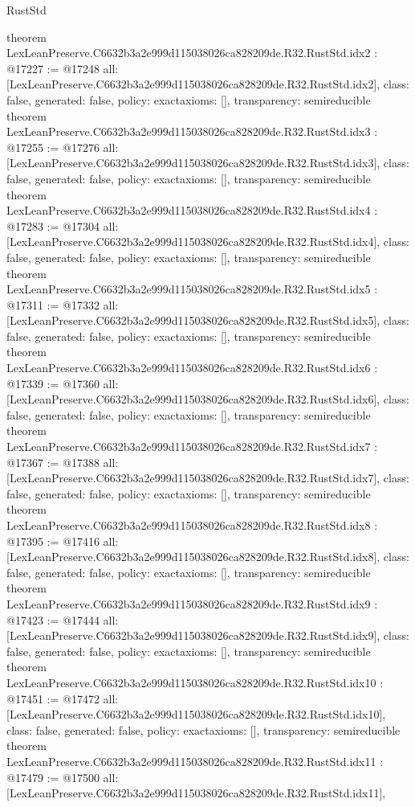 \begin{lexlean}{RustStd}
\begin{coremodule}
{}
theorem LexLeanPreserve.C6632b3a2e999d115038026ca828209de.R32.RustStd.idx2 : @17227 := @17248 {
  all: [LexLeanPreserve.C6632b3a2e999d115038026ca828209de.R32.RustStd.idx2],
  class: false,
  generated: false,
  policy: exact{axioms: []},
  transparency: semireducible
}
theorem LexLeanPreserve.C6632b3a2e999d115038026ca828209de.R32.RustStd.idx3 : @17255 := @17276 {
  all: [LexLeanPreserve.C6632b3a2e999d115038026ca828209de.R32.RustStd.idx3],
  class: false,
  generated: false,
  policy: exact{axioms: []},
  transparency: semireducible
}
theorem LexLeanPreserve.C6632b3a2e999d115038026ca828209de.R32.RustStd.idx4 : @17283 := @17304 {
  all: [LexLeanPreserve.C6632b3a2e999d115038026ca828209de.R32.RustStd.idx4],
  class: false,
  generated: false,
  policy: exact{axioms: []},
  transparency: semireducible
}
theorem LexLeanPreserve.C6632b3a2e999d115038026ca828209de.R32.RustStd.idx5 : @17311 := @17332 {
  all: [LexLeanPreserve.C6632b3a2e999d115038026ca828209de.R32.RustStd.idx5],
  class: false,
  generated: false,
  policy: exact{axioms: []},
  transparency: semireducible
}
theorem LexLeanPreserve.C6632b3a2e999d115038026ca828209de.R32.RustStd.idx6 : @17339 := @17360 {
  all: [LexLeanPreserve.C6632b3a2e999d115038026ca828209de.R32.RustStd.idx6],
  class: false,
  generated: false,
  policy: exact{axioms: []},
  transparency: semireducible
}
theorem LexLeanPreserve.C6632b3a2e999d115038026ca828209de.R32.RustStd.idx7 : @17367 := @17388 {
  all: [LexLeanPreserve.C6632b3a2e999d115038026ca828209de.R32.RustStd.idx7],
  class: false,
  generated: false,
  policy: exact{axioms: []},
  transparency: semireducible
}
theorem LexLeanPreserve.C6632b3a2e999d115038026ca828209de.R32.RustStd.idx8 : @17395 := @17416 {
  all: [LexLeanPreserve.C6632b3a2e999d115038026ca828209de.R32.RustStd.idx8],
  class: false,
  generated: false,
  policy: exact{axioms: []},
  transparency: semireducible
}
theorem LexLeanPreserve.C6632b3a2e999d115038026ca828209de.R32.RustStd.idx9 : @17423 := @17444 {
  all: [LexLeanPreserve.C6632b3a2e999d115038026ca828209de.R32.RustStd.idx9],
  class: false,
  generated: false,
  policy: exact{axioms: []},
  transparency: semireducible
}
theorem LexLeanPreserve.C6632b3a2e999d115038026ca828209de.R32.RustStd.idx10 : @17451 := @17472 {
  all: [LexLeanPreserve.C6632b3a2e999d115038026ca828209de.R32.RustStd.idx10],
  class: false,
  generated: false,
  policy: exact{axioms: []},
  transparency: semireducible
}
theorem LexLeanPreserve.C6632b3a2e999d115038026ca828209de.R32.RustStd.idx11 : @17479 := @17500 {
  all: [LexLeanPreserve.C6632b3a2e999d115038026ca828209de.R32.RustStd.idx11],
}
\end{coremodule}
\end{lexlean}
